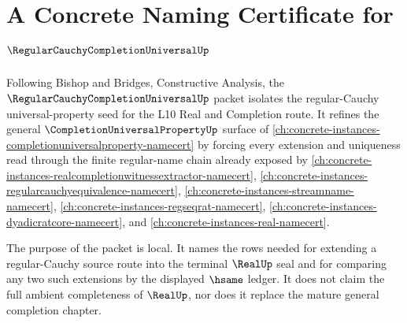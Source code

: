 \chapter{A Concrete Naming Certificate for $\RegularCauchyCompletionUniversalUp$}
\label{ch:concrete-instances-regular-cauchy-completion-universal-namecert}

Following Bishop and Bridges, Constructive Analysis, the $\RegularCauchyCompletionUniversalUp$ packet isolates the regular-Cauchy universal-property seed for the L10 Real and Completion route. It refines the general $\CompletionUniversalPropertyUp$ surface of \autoref{ch:concrete-instances-completionuniversalproperty-namecert} by forcing every extension and uniqueness read through the finite regular-name chain already exposed by \autoref{ch:concrete-instances-realcompletionwitnessextractor-namecert}, \autoref{ch:concrete-instances-regularcauchyequivalence-namecert}, \autoref{ch:concrete-instances-streamname-namecert}, \autoref{ch:concrete-instances-regseqrat-namecert}, \autoref{ch:concrete-instances-dyadicratcore-namecert}, and \autoref{ch:concrete-instances-real-namecert}.

The purpose of the packet is local. It names the rows needed for extending a regular-Cauchy source route into the terminal $\RealUp$ seal and for comparing any two such extensions by the displayed $\hsame$ ledger. It does not claim the full ambient completeness of $\RealUp$, nor does it replace the mature general completion chapter.

